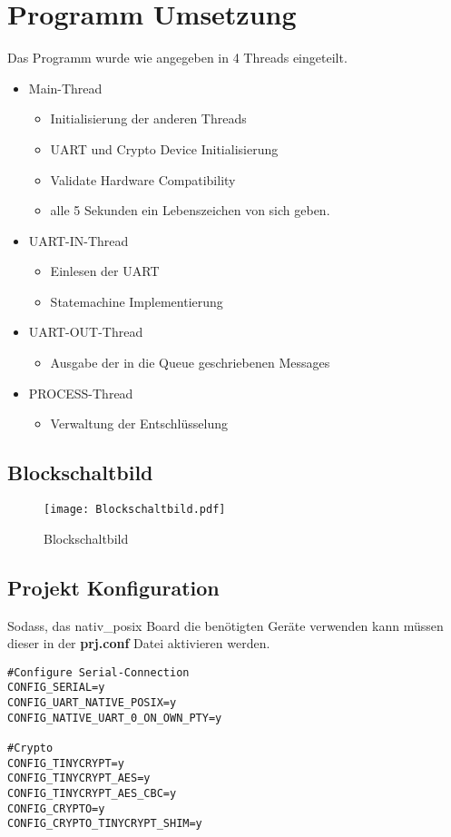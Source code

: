 \newpage
\section{Programm Umsetzung}
Das Programm wurde wie angegeben in 4 Threads eingeteilt.
\begin{itemize}
    \item Main-Thread
    \begin{itemize}
        \item Initialisierung der anderen Threads
        \item UART und Crypto Device Initialisierung 
        \item Validate Hardware Compatibility 
        \item alle 5 Sekunden ein Lebenszeichen von sich geben. 
    \end{itemize} 
    \item UART-IN-Thread
    \begin{itemize}
        \item Einlesen der UART 
        \item Statemachine Implementierung
    \end{itemize}
    \item UART-OUT-Thread
    \begin{itemize}
        \item Ausgabe der in die Queue geschriebenen Messages
    \end{itemize}
    \item PROCESS-Thread
    \begin{itemize}
        \item Verwaltung der Entschlüsselung 
    \end{itemize}
\end{itemize}
\subsection{Blockschaltbild}
\begin{figure}[!ht]
    \centering
    \texttt{[image: Blockschaltbild.pdf]}
    \caption{Blockschaltbild}
    \label{fig:Blockschaltbild}
\end{figure}




\newpage
\subsection{Projekt Konfiguration}
Sodass, das nativ\_posix Board die benötigten Geräte verwenden kann müssen dieser in der \textbf{prj.conf} Datei aktivieren werden. 
\begin{lstlisting}[style=StylePython, captionpos=b, caption=prj.conf, label=pjr.conf]
#Configure Serial-Connection
CONFIG_SERIAL=y
CONFIG_UART_NATIVE_POSIX=y
CONFIG_NATIVE_UART_0_ON_OWN_PTY=y

#Crypto
CONFIG_TINYCRYPT=y
CONFIG_TINYCRYPT_AES=y
CONFIG_TINYCRYPT_AES_CBC=y
CONFIG_CRYPTO=y
CONFIG_CRYPTO_TINYCRYPT_SHIM=y
\end{lstlisting}

